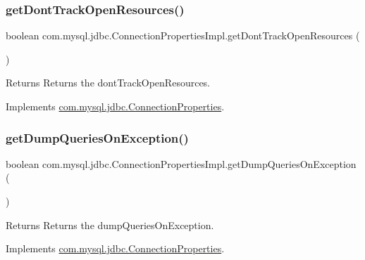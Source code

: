\subsubsection{\texorpdfstring{get\+Dont\+Track\+Open\+Resources()}{getDontTrackOpenResources()}}
{\footnotesize\ttfamily boolean com.\+mysql.\+jdbc.\+Connection\+Properties\+Impl.\+get\+Dont\+Track\+Open\+Resources (\begin{DoxyParamCaption}{ }\end{DoxyParamCaption})}

\begin{DoxyReturn}{Returns}
Returns the dont\+Track\+Open\+Resources. 
\end{DoxyReturn}


Implements \mbox{\hyperlink{interfacecom_1_1mysql_1_1jdbc_1_1_connection_properties_aec0f6158d9bacdc45d430fbddcc93120}{com.\+mysql.\+jdbc.\+Connection\+Properties}}.

\mbox{\label{classcom_1_1mysql_1_1jdbc_1_1_connection_properties_impl_a500213349eb1bb4982e51d96d261e8ae}} 
\subsubsection{\texorpdfstring{get\+Dump\+Queries\+On\+Exception()}{getDumpQueriesOnException()}}
{\footnotesize\ttfamily boolean com.\+mysql.\+jdbc.\+Connection\+Properties\+Impl.\+get\+Dump\+Queries\+On\+Exception (\begin{DoxyParamCaption}{ }\end{DoxyParamCaption})}

\begin{DoxyReturn}{Returns}
Returns the dump\+Queries\+On\+Exception. 
\end{DoxyReturn}


Implements \mbox{\hyperlink{interfacecom_1_1mysql_1_1jdbc_1_1_connection_properties_a582cd7a28b4d507bf0e3ceaae3680763}{com.\+mysql.\+jdbc.\+Connection\+Properties}}.

\mbox{\label{classcom_1_1mysql_1_1jdbc_1_1_connection_properties_impl_ace467e9ed5808a6a4d40e65fe10480f4}} 
